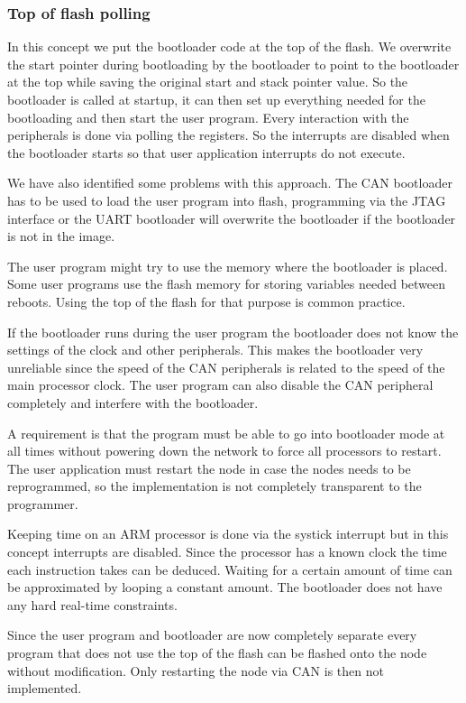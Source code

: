 \documentclass[twocolumn]{article}
\begin{document}
		\subsubsection*{Top of flash polling}
			In this concept we put the bootloader code at the top of the flash.
			We overwrite the start pointer during bootloading by the bootloader to point to the bootloader at the top while saving the original start and stack pointer value.
			So the bootloader is called at startup,
			it can then set up everything needed for the bootloading and then start the user program.
			Every interaction with the peripherals is done via polling the registers.
			So the interrupts are disabled when the bootloader starts so that user application interrupts do not execute.
			
			We have also identified some problems with this approach.
			The CAN bootloader has to be used to load the user program into flash,
			programming via the JTAG interface or the UART bootloader will overwrite the bootloader if the bootloader is not in the image.
			
			The user program might try to use the memory where the bootloader is placed.
			Some user programs use the flash memory for storing variables needed between reboots.
			Using the top of the flash for that purpose is common practice.
			
			If the bootloader runs during the user program the bootloader does not know the settings of the clock and other peripherals.
			This makes the bootloader very unreliable since the speed of the CAN peripherals is related to the speed of the main processor clock.
			The user program can also disable the CAN peripheral completely and interfere with the bootloader.
			
			A requirement is that the program must be able to go into bootloader mode at all times without powering down the network to force all processors to restart.
			The user application must restart the node in case the nodes needs to be reprogrammed,
			so the implementation is not completely transparent to the programmer.
			
			Keeping time on an ARM processor is done via the systick interrupt but in this concept interrupts are disabled.
			Since the processor has a known clock the time each instruction takes can be deduced.
			Waiting for a certain amount of time can be approximated by looping a constant amount.
			The bootloader does not have any hard real-time constraints.
			
			Since the user program and bootloader are now completely separate every program that does not use the top of the flash can be flashed onto the node without modification.
			Only restarting the node via CAN is then not implemented.
		
\end{document}
